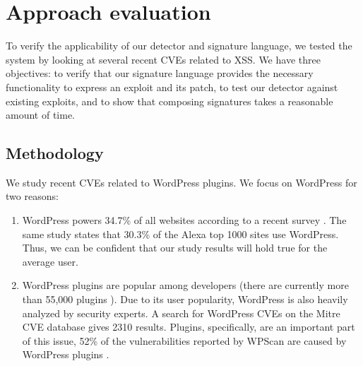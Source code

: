 \section{Approach evaluation} \label{viability}

To verify the applicability of our detector and signature language, we tested the system by looking at several recent CVEs related to \ac{XSS}. We have three objectives: to verify that our signature language provides the necessary functionality to express an exploit and its patch, to test our detector against existing exploits, and to show that composing signatures takes a reasonable amount of time.


\subsection{Methodology} \label{methodology}

We study recent CVEs related to WordPress
plugins. We focus on WordPress for two reasons:
\begin{enumerate}
	\item WordPress powers 34.7\% of all websites according to a recent survey  \cite{w3stats} \cite{DBLP:journals/corr/abs-1801-01203}. The same study states that 30.3\% of the Alexa top 1000 sites use WordPress. Thus, we can be confident that our study results will hold true for the average user.
	\item WordPress plugins are popular among developers (there are currently more than 55,000 plugins \cite{wpplugins}). Due to its user popularity, WordPress is also heavily analyzed by security experts. A search for WordPress CVEs on the Mitre CVE database \cite{cvemitre} gives 2310 results. Plugins, specifically, are an important part of this issue, 52\% of the vulnerabilities reported by WPScan are caused by WordPress plugins \cite{wpscan}.
\end{enumerate}

